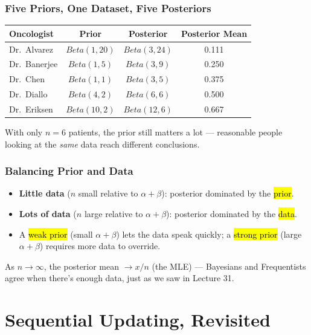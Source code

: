 \documentclass[slidestop,compress,mathserif]{beamer}
\begin{document}
\begin{frame}
    \frametitle{Five Priors, One Dataset, Five Posteriors}
    \begin{center}
    \renewcommand{\arraystretch}{1.2}
    \begin{tabular}{lccc}
    \toprule
    Oncologist & Prior & Posterior & Posterior Mean \\
    \midrule
    Dr.\ Alvarez  & $Beta(1,20)$ & $Beta(3,24)$ & 0.111 \\
    Dr.\ Banerjee & $Beta(1,5)$  & $Beta(3,9)$  & 0.250 \\
    Dr.\ Chen     & $Beta(1,1)$  & $Beta(3,5)$  & 0.375 \\
    Dr.\ Diallo   & $Beta(4,2)$  & $Beta(6,6)$  & 0.500 \\
    Dr.\ Eriksen  & $Beta(10,2)$ & $Beta(12,6)$ & 0.667 \\
    \bottomrule
    \end{tabular}
    \end{center}
    \pause

    \medskip
    With only $n=6$ patients, the prior still matters a lot --- reasonable people looking at the \emph{same} data reach different conclusions.
\end{frame}

\begin{frame}
    \frametitle{Balancing Prior and Data}
    \pause
    \begin{itemize}
        \item \textbf{Little data} ($n$ small relative to $\alpha+\beta$): posterior dominated by the \hl{prior}.
        \pause
        \item \textbf{Lots of data} ($n$ large relative to $\alpha+\beta$): posterior dominated by the \hl{data}.
        \pause
        \item A \hl{weak prior} (small $\alpha+\beta$) lets the data speak quickly; a \hl{strong prior} (large $\alpha+\beta$) requires more data to override.
    \end{itemize}
    \pause

    \medskip
    As $n\to\infty$, the posterior mean $\to x/n$ (the MLE) --- Bayesians and Frequentists agree when there's enough data, just as we saw in Lecture 31.
\end{frame}


\section{Sequential Updating, Revisited}
\end{document}
